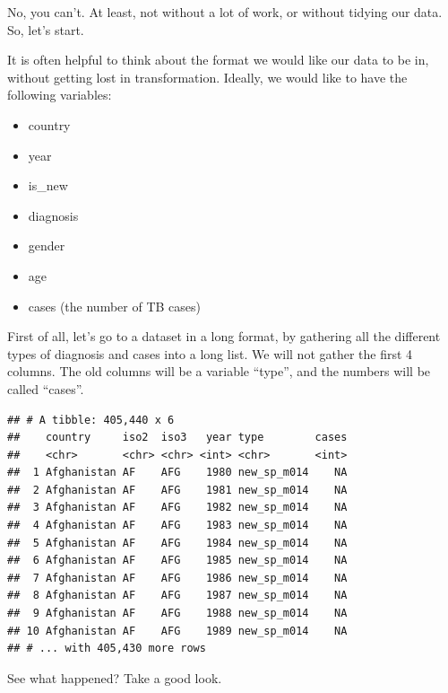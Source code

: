\documentclass[]{tufte-book}
\newenvironment{Shaded}{}{}
\newcommand{\DataTypeTok}[1]{\textcolor[rgb]{0.56,0.13,0.00}{#1}}
\newcommand{\KeywordTok}[1]{\textcolor[rgb]{0.00,0.44,0.13}{\textbf{#1}}}
\newcommand{\NormalTok}[1]{#1}
\newcommand{\OperatorTok}[1]{\textcolor[rgb]{0.40,0.40,0.40}{#1}}
\newcommand{\StringTok}[1]{\textcolor[rgb]{0.25,0.44,0.63}{#1}}
\providecommand{\tightlist}{%
  \setlength{\itemsep}{0pt}\setlength{\parskip}{0pt}}
\begin{document}
No, you can't. At least, not without a lot of work, or without tidying our data. So, let's start.

It is often helpful to think about the format we would like our data to be in, without getting lost in transformation. Ideally, we would like to have the following variables:

\begin{itemize}
\tightlist
\item
  country
\item
  year
\item
  is\_new
\item
  diagnosis
\item
  gender
\item
  age
\item
  cases (the number of TB cases)
\end{itemize}

First of all, let's go to a dataset in a long format, by gathering all the different types of diagnosis and cases into a long list. We will not gather the first 4 columns. The old columns will be a variable ``type'', and the numbers will be called ``cases''.

\begin{Shaded}
\end{Shaded}

\begin{verbatim}
## # A tibble: 405,440 x 6
##    country     iso2  iso3   year type        cases
##    <chr>       <chr> <chr> <int> <chr>       <int>
##  1 Afghanistan AF    AFG    1980 new_sp_m014    NA
##  2 Afghanistan AF    AFG    1981 new_sp_m014    NA
##  3 Afghanistan AF    AFG    1982 new_sp_m014    NA
##  4 Afghanistan AF    AFG    1983 new_sp_m014    NA
##  5 Afghanistan AF    AFG    1984 new_sp_m014    NA
##  6 Afghanistan AF    AFG    1985 new_sp_m014    NA
##  7 Afghanistan AF    AFG    1986 new_sp_m014    NA
##  8 Afghanistan AF    AFG    1987 new_sp_m014    NA
##  9 Afghanistan AF    AFG    1988 new_sp_m014    NA
## 10 Afghanistan AF    AFG    1989 new_sp_m014    NA
## # ... with 405,430 more rows
\end{verbatim}

See what happened? Take a good look.
\end{document}
